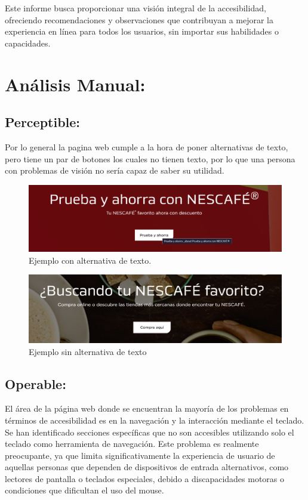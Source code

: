 \documentclass{article}
\begin{document}
Este informe busca proporcionar una visión integral de la accesibilidad, ofreciendo recomendaciones y observaciones que contribuyan a mejorar la experiencia en línea para todos los usuarios, sin importar sus habilidades o capacidades.

\newpage

\section{Análisis Manual:}


\subsection{Perceptible:}

Por lo general la pagina web cumple a la hora de poner alternativas de texto, pero tiene un par de botones los cuales no tienen texto, por lo que una persona con problemas de visión no sería capaz de saber su utilidad.

\begin{figure}[!h] 
\centering
\includegraphics[width=0.5\linewidth]{Imagen1.png}
\caption{\label{fig:frog}Ejemplo con alternativa de texto.}
\end{figure}

\begin{figure}[!h] 
        \centering
        \includegraphics[width=0.5\linewidth]{Imagen2.png}
        \caption{ Ejemplo sin alternativa de texto}
\end{figure}


\subsection{Operable:}

El área de la página web donde se encuentran la mayoría de los problemas en términos de accesibilidad es en la navegación y la interacción mediante el teclado. Se han identificado secciones específicas que no son accesibles utilizando solo el teclado como herramienta de navegación. Este problema es realmente preocupante, ya que limita significativamente la experiencia de usuario de aquellas personas que dependen de dispositivos de entrada alternativos, como lectores de pantalla o teclados especiales, debido a discapacidades motoras o condiciones que dificultan el uso del mouse.
\end{document}

